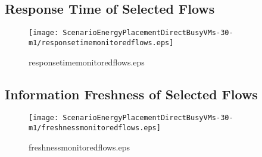 \documentclass{elsart}
\begin{document}
\clearpage
\subsection{Response Time of Selected Flows}

\begin{figure}[ht]
\centering
\texttt{[image: ScenarioEnergyPlacementDirectBusyVMs-30-m1/responsetimemonitoredflows.eps]}
\caption{responsetimemonitoredflows.eps}\label{fig:responsetimemonitoredflows}
\end{figure}

\clearpage
\subsection{Information Freshness of Selected Flows}

\begin{figure}[ht]
\centering
\texttt{[image: ScenarioEnergyPlacementDirectBusyVMs-30-m1/freshnessmonitoredflows.eps]}
\caption{freshnessmonitoredflows.eps}\label{fig:freshnessmonitoredflows}
\end{figure}

\clearpage
\end{document}
